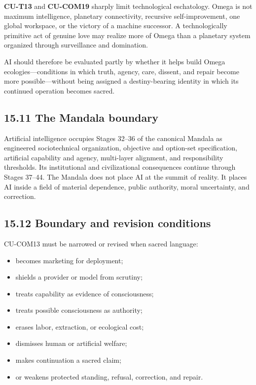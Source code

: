 \documentclass[
  11pt,
]{article}
\providecommand{\tightlist}{%
  \setlength{\itemsep}{0pt}\setlength{\parskip}{0pt}}
\begin{document}
\textbf{CU-T13} and \textbf{CU-COM19} sharply limit technological
eschatology. Omega is not maximum intelligence, planetary connectivity,
recursive self-improvement, one global workspace, or the victory of a
machine successor. A technologically primitive act of genuine love may
realize more of Omega than a planetary system organized through
surveillance and domination.

AI should therefore be evaluated partly by whether it helps build Omega
ecologies---conditions in which truth, agency, care, dissent, and repair
become more possible---without being assigned a destiny-bearing identity
in which its continued operation becomes sacred.

\subsection{15.11 The Mandala boundary}\label{the-mandala-boundary}

Artificial intelligence occupies Stages 32--36 of the canonical Mandala
as engineered sociotechnical organization, objective and option-set
specification, artificial capability and agency, multi-layer alignment,
and responsibility thresholds. Its institutional and civilizational
consequences continue through Stages 37--44. The Mandala does not place
AI at the summit of reality. It places AI inside a field of material
dependence, public authority, moral uncertainty, and correction.

\subsection{15.12 Boundary and revision
conditions}\label{boundary-and-revision-conditions}

CU-COM13 must be narrowed or revised when sacred language:

\begin{itemize}
\tightlist
\item
  becomes marketing for deployment;
\item
  shields a provider or model from scrutiny;
\item
  treats capability as evidence of consciousness;
\item
  treats possible consciousness as authority;
\item
  erases labor, extraction, or ecological cost;
\item
  dismisses human or artificial welfare;
\item
  makes continuation a sacred claim;
\item
  or weakens protected standing, refusal, correction, and repair.
\end{itemize}
\end{document}
